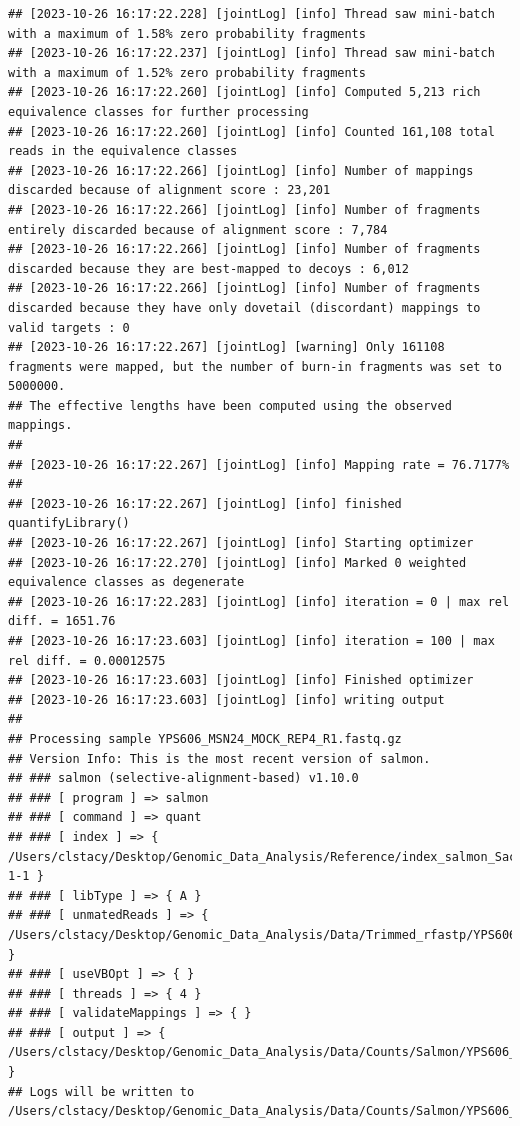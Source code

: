 \documentclass[
]{book}
\begin{document}
\begin{verbatim}
## [2023-10-26 16:17:22.228] [jointLog] [info] Thread saw mini-batch with a maximum of 1.58% zero probability fragments
## [2023-10-26 16:17:22.237] [jointLog] [info] Thread saw mini-batch with a maximum of 1.52% zero probability fragments
## [2023-10-26 16:17:22.260] [jointLog] [info] Computed 5,213 rich equivalence classes for further processing
## [2023-10-26 16:17:22.260] [jointLog] [info] Counted 161,108 total reads in the equivalence classes 
## [2023-10-26 16:17:22.266] [jointLog] [info] Number of mappings discarded because of alignment score : 23,201
## [2023-10-26 16:17:22.266] [jointLog] [info] Number of fragments entirely discarded because of alignment score : 7,784
## [2023-10-26 16:17:22.266] [jointLog] [info] Number of fragments discarded because they are best-mapped to decoys : 6,012
## [2023-10-26 16:17:22.266] [jointLog] [info] Number of fragments discarded because they have only dovetail (discordant) mappings to valid targets : 0
## [2023-10-26 16:17:22.267] [jointLog] [warning] Only 161108 fragments were mapped, but the number of burn-in fragments was set to 5000000.
## The effective lengths have been computed using the observed mappings.
## 
## [2023-10-26 16:17:22.267] [jointLog] [info] Mapping rate = 76.7177%
## 
## [2023-10-26 16:17:22.267] [jointLog] [info] finished quantifyLibrary()
## [2023-10-26 16:17:22.267] [jointLog] [info] Starting optimizer
## [2023-10-26 16:17:22.270] [jointLog] [info] Marked 0 weighted equivalence classes as degenerate
## [2023-10-26 16:17:22.283] [jointLog] [info] iteration = 0 | max rel diff. = 1651.76
## [2023-10-26 16:17:23.603] [jointLog] [info] iteration = 100 | max rel diff. = 0.00012575
## [2023-10-26 16:17:23.603] [jointLog] [info] Finished optimizer
## [2023-10-26 16:17:23.603] [jointLog] [info] writing output 
## 
## Processing sample YPS606_MSN24_MOCK_REP4_R1.fastq.gz
## Version Info: This is the most recent version of salmon.
## ### salmon (selective-alignment-based) v1.10.0
## ### [ program ] => salmon 
## ### [ command ] => quant 
## ### [ index ] => { /Users/clstacy/Desktop/Genomic_Data_Analysis/Reference/index_salmon_Saccharomyces_cerevisiae.R64-1-1 }
## ### [ libType ] => { A }
## ### [ unmatedReads ] => { /Users/clstacy/Desktop/Genomic_Data_Analysis/Data/Trimmed_rfastp/YPS606_MSN24_MOCK_REP4_R1.fastq.gz }
## ### [ useVBOpt ] => { }
## ### [ threads ] => { 4 }
## ### [ validateMappings ] => { }
## ### [ output ] => { /Users/clstacy/Desktop/Genomic_Data_Analysis/Data/Counts/Salmon/YPS606_MSN24_MOCK_REP4_R1.fastq.gz_quant }
## Logs will be written to /Users/clstacy/Desktop/Genomic_Data_Analysis/Data/Counts/Salmon/YPS606_MSN24_MOCK_REP4_R1.fastq.gz_quant/logs

\end{verbatim}
\end{document}
